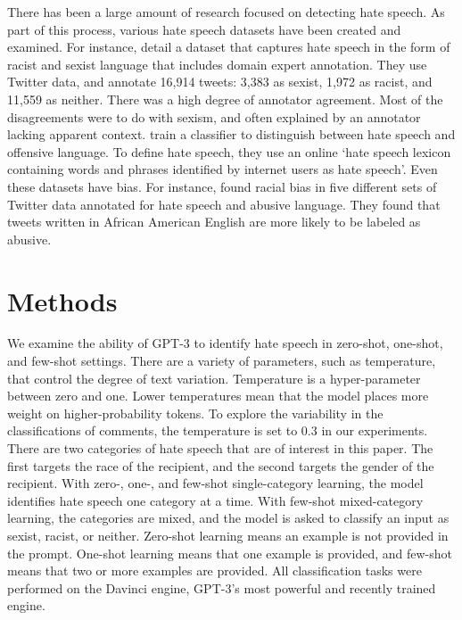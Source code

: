 \documentclass[12pt,]{article}
\begin{document}
There has been a large amount of research focused on detecting hate speech. As part of this process, various hate speech datasets have been created and examined. For instance, \citet{waseem2016hateful} detail a dataset that captures hate speech in the form of racist and sexist language that includes domain expert annotation. They use Twitter data, and annotate 16,914 tweets: 3,383 as sexist, 1,972 as racist, and 11,559 as neither. There was a high degree of annotator agreement. Most of the disagreements were to do with sexism, and often explained by an annotator lacking apparent context. \citet{davidson2017automated} train a classifier to distinguish between hate speech and offensive language. To define hate speech, they use an online `hate speech lexicon containing words and phrases identified by internet users as hate speech'. Even these datasets have bias. For instance, \citet{davidson2019racial} found racial bias in five different sets of Twitter data annotated for hate speech and abusive language. They found that tweets written in African American English are more likely to be labeled as abusive.

\hypertarget{methods}{%
\section{Methods}\label{methods}}

We examine the ability of GPT-3 to identify hate speech in zero-shot, one-shot, and few-shot settings. There are a variety of parameters, such as temperature, that control the degree of text variation. Temperature is a hyper-parameter between zero and one. Lower temperatures mean that the model places more weight on higher-probability tokens. To explore the variability in the classifications of comments, the temperature is set to 0.3 in our experiments. There are two categories of hate speech that are of interest in this paper. The first targets the race of the recipient, and the second targets the gender of the recipient. With zero-, one-, and few-shot single-category learning, the model identifies hate speech one category at a time. With few-shot mixed-category learning, the categories are mixed, and the model is asked to classify an input as sexist, racist, or neither. Zero-shot learning means an example is not provided in the prompt. One-shot learning means that one example is provided, and few-shot means that two or more examples are provided. All classification tasks were performed on the Davinci engine, GPT-3's most powerful and recently trained engine.
\end{document}
